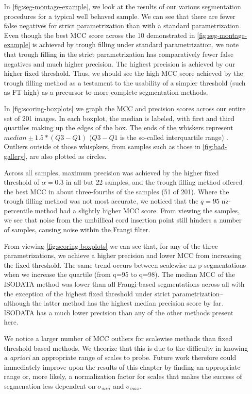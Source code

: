 In \cref{fig:seg-montage-example}, we look at the results of our various segmentation procedures for a typical well behaved sample. We can see that there are fewer false negatives for strict parametrization than with a standard parametrization. Even though the best MCC score across the 10 demonstrated in \cref{fig:seg-montage-example} is achieved by trough filling under standard parametrization, we note that trough filling in the strict parametrization has comparatively fewer false negatives and much higher precision. The highest precision is achieved by our higher fixed threshold. Thus, we should see the high MCC score achieved by the trough filling method as a testament to the usability of a simpler threshold (such as FT-high) as a precursor to more complete segmentation methods.


In \cref{fig:scoring-boxplots} we graph the MCC and precision scores across our entire set of 201 images. In each boxplot, the median is labeled, with first and third quartiles making up the edges of the box. The ends of the whiskers represent  $median \pm 1.5*(Q3-Q1)$ ($Q3-Q1$ is the so-called interquartile range) \cite{scipy}. Outliers outside of those whispkers, from samples such as those in \cref{fig:bad-gallery}, are also plotted as circles.

Across all samples, maximum precision was achieved by the higher fixed threshold of $\alpha =0.3 $ in all but 22 samples, and the trough filling method offered the best MCC in about three-fourths of the samples (51 of 201). Where the trough filling method was not most accurate, we noticed that the $q=95 $ nz-percentile method had a slightly higher MCC score. From viewing the samples, we see that noise from the umbillical cord insertion point still hinders a number of samples, causing noise within the Frangi filter. 

From viewing \cref{fig:scoring-boxplots} we can see that, for any of the
three parametrizations, we achieve a higher precision and lower MCC from increasing the fixed threshold. The same trend occurs between scalewise nz-p segmentations when we increase the quartile (from q=95 to q=98). The median MCC of the ISODATA method was lower than all Frangi-based segmentations across all with the exception of the highest fixed threshold under strict parametrization--although the latter method has the highest median precision score by far. ISODATA has a much lower precision than any of the other methods present here.

We notice a larger number of MCC outliers for scalewise methods than fixed threshold based methods. We theorize that this is due to the difficulty in knowing \textit{a apriori} an appropriate range of scales to probe. Future work therefore could immediately improve upon the results of this chapter by finding an appropriate range or, more likely, a normalization factor for scales that makes the success of segmenation less dependent on $\sigma_{min}$ and $\sigma_{max}$.

